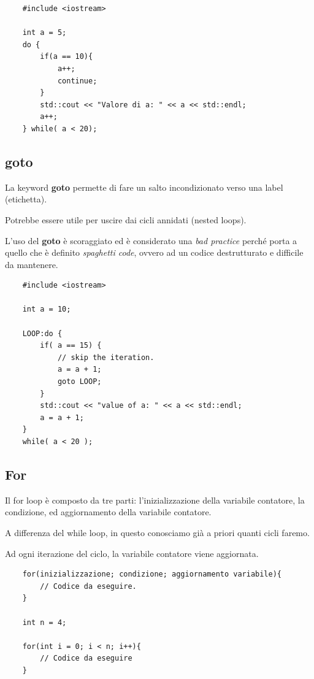 \begin{lstlisting}
	#include <iostream>
	
	int a = 5;
	do {
		if(a == 10){
			a++;
			continue;
		}
		std::cout << "Valore di a: " << a << std::endl;
		a++;
	} while( a < 20);
\end{lstlisting}

\subsection{goto}

\textsf{\small La keyword \textbf{goto} permette di fare un salto incondizionato verso una label (etichetta).}

\textsf{\small Potrebbe essere utile per uscire dai cicli annidati (nested loops).}

\textsf{\small L'uso del \textbf{goto} è scoraggiato ed è considerato una \emph{bad practice} perché porta a quello che è definito \emph{spaghetti code}, ovvero ad un codice destrutturato e difficile da mantenere.} \\

\begin{lstlisting}
	#include <iostream>
	
	int a = 10;
	
	LOOP:do {
		if( a == 15) {
			// skip the iteration.
			a = a + 1;
			goto LOOP;
		}
		std::cout << "value of a: " << a << std::endl;
		a = a + 1;
	} 
	while( a < 20 );
\end{lstlisting}

\subsection{For}

\textsf{\small Il for loop è composto da tre parti: l'inizializzazione della variabile contatore, la condizione, ed aggiornamento della variabile contatore. }

\textsf{\small A differenza del while loop, in questo conosciamo già a priori quanti cicli faremo.}

\textsf{\small Ad ogni iterazione del ciclo, la variabile contatore viene aggiornata.} \\

\begin{lstlisting}
	for(inizializzazione; condizione; aggiornamento variabile){
		// Codice da eseguire.
	}

	int n = 4;
	
	for(int i = 0; i < n; i++){
		// Codice da eseguire
	}
\end{lstlisting}

